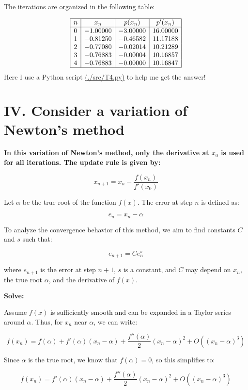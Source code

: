 \documentclass[a4paper]{article}
\begin{document}
The iterations are organized in the following table:

\[
\begin{array}{|c|c|c|c|}
\hline
n & x_n & p(x_n) & p'(x_n) \\
\hline
0&-1.00000&-3.00000&16.00000\\
1&-0.81250&-0.46582&11.17188\\
2&-0.77080&-0.02014&10.21289\\
3&-0.76883&-0.00004&10.16857\\
4&-0.76883&-0.00000&10.16847\\
\hline
\end{array}
\]
Here I use a Python script \href{file:./src/}{(./src/T4.py)} to help me get the answer!

\section*{IV. Consider a variation of Newton’s method}

\textbf{In this variation of Newton’s method, only the derivative at \( x_0 \) is used for all iterations. The update rule is given by:}

\[
x_{n+1} = x_n - \frac{f(x_n)}{f'(x_0)}
\]

Let \( \alpha \) be the true root of the function \( f(x) \). The error at step \( n \) is defined as:

\[
e_n = x_n - \alpha
\]

To analyze the convergence behavior of this method, we aim to find constants \( C \) and \( s \) such that:

\[
e_{n+1} = C e_n^s
\]

where \( e_{n+1} \) is the error at step \( n+1 \), \( s \) is a constant, and \( C \) may depend on \( x_n \), the true root \( \alpha \), and the derivative of \( f(x) \).

\textbf{Solve:}

Assume \( f(x) \) is sufficiently smooth and can be expanded in a Taylor series around \( \alpha \). Thus, for \( x_n \) near \( \alpha \), we can write:

\[
f(x_n) = f(\alpha) + f'(\alpha)(x_n - \alpha) + \frac{f''(\alpha)}{2}(x_n - \alpha)^2 + O((x_n - \alpha)^3)
\]

Since \( \alpha \) is the true root, we know that \( f(\alpha) = 0 \), so this simplifies to:

\[
f(x_n) = f'(\alpha)(x_n - \alpha) + \frac{f''(\alpha)}{2}(x_n - \alpha)^2 + O((x_n - \alpha)^3)
\]
\end{document}
